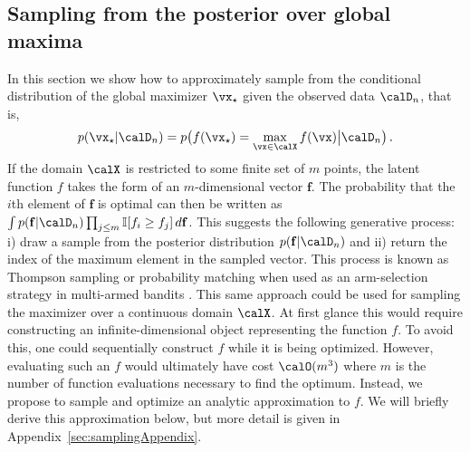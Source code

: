 \subsection{Sampling from the posterior over global maxima}
\label{sec:sampling}

In this section we show how to approximately sample from the conditional
distribution of the global maximizer $\xopt$ given the observed data $\D_n$,
that is,
\begin{align}
    p(\xopt|\D_n) =
    p\big(f(\xopt) = \max_{\x\in\X} f(\x)\big|\D_n\big)\,.
\end{align}
If the domain $\X$ is restricted to some finite set of $m$ points,
the latent function $f$ takes the form of an $m$-dimensional vector $\mathbf{f}$.
The probability that the $i$th element of $\mathbf{f}$ is optimal can then be written
as $\int p(\mathbf{f}|\D_n) \prod_{j\leq m} \I[f_i \geq f_j] \,d\mathbf{f}$. This suggests the
following generative process: i) draw a sample from the posterior distribution $p(\mathbf{f}|\D_n)$ and
ii) return the index of the maximum element in the sampled vector. 
This process is known as Thompson sampling or probability matching 
when used as an arm-selection strategy in multi-armed bandits \cite{Li:2011}.
This same approach could be used for sampling the maximizer over a continuous
domain $\X$. At first glance this would require constructing an
infinite-dimensional object representing the function $f$.
To avoid this, one could sequentially construct $f$ while it is being optimized. However, evaluating
such an $f$ would ultimately have cost $\calO(m^3)$ where $m$ is the
number of function evaluations necessary to find the optimum.  
Instead, we propose to sample and optimize an analytic approximation to $f$.
We will briefly derive this approximation below, but more detail is given in Appendix~\ref{sec:samplingAppendix}.

